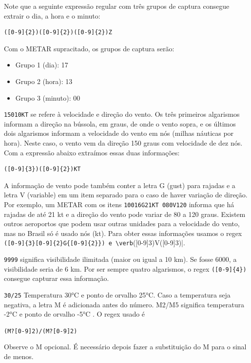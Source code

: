Note que a seguinte expressão regular com três grupos de captura consegue extrair 
o dia, a hora e o minuto:

\begin{verbatim}
([0-9]{2})([0-9]{2})([0-9]{2})Z
\end{verbatim}

Com o METAR supracitado, os grupos de captura serão:

\begin{itemize}
\item Grupo 1 (dia): 17
\item Grupo 2 (hora): 13
\item Grupo 3 (minuto): 00
\end{itemize}

\texttt{15010KT} se refere à velocidade e direção do vento. Os três primeiros 
algarismos informam a direção na bússola, em graus, de onde o vento sopra, e os 
últimos dois algarismos informam a velocidade do vento em nós (milhas náuticas por hora). 
Neste caso, o vento vem da direção 150 graus com velocidade de dez nós. Com a 
expressão abaixo extraímos essas duas informações:

\begin{verbatim}
([0-9]{3})([0-9]{2})KT
\end{verbatim}

A informação de vento pode também conter a letra G (gust) para rajadas e a letra 
V (variable) em um item separado para o caso de haver variação de direção. Por 
exemplo, um METAR com os itens \texttt{10016G21KT 080V120} informa que há rajadas 
de até 21 kt e a direção do vento pode variar de 80 a 120 graus. Existem outros 
aeroportos que podem usar outras unidades para a velocidade do vento, mas no 
Brasil só é usado nós (kt). Para obter essas informações usamos o regex 
\verb|([0-9]{3}[0-9]{2}G{[0-9]{2}}) e \verb|([0-9]{3})V([0-9]{3})|.

\texttt{9999} significa visibilidade ilimitada (maior ou igual a 10 km). Se fosse 
6000, a visibilidade seria de 
6 km. Por ser sempre quatro algarismos, o regex \verb|([0-9]{4})| consegue capturar 
essa informação.

\texttt{30/25} Temperatura 30°C e ponto de orvalho 25°C. Caso a temperatura seja 
negativa, a letra M é adicionada antes do número. M2/M5 significa temperatura 
-2°C e ponto de orvalho -5°C \cite{METAR-help}. O regex usado é

\texttt{(M?[0-9]{2})/(M?[0-9]{2})}

Observe o M opcional. É necessário depois fazer a substituição do M para o sinal
de menos.

